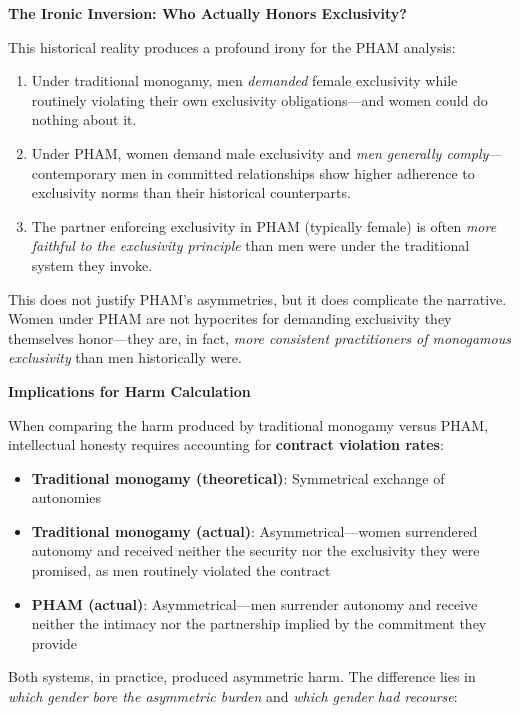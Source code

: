 \documentclass[12pt, letterpaper]{article}
\begin{document}
\textbf{The Ironic Inversion: Who Actually Honors Exclusivity?}

This historical reality produces a profound irony for the PHAM analysis:

\begin{enumerate}
    \item Under traditional monogamy, men \textit{demanded} female exclusivity while routinely violating their own exclusivity obligations---and women could do nothing about it.
    
    \item Under PHAM, women demand male exclusivity and \textit{men generally comply}---contemporary men in committed relationships show higher adherence to exclusivity norms than their historical counterparts.
    
    \item The partner enforcing exclusivity in PHAM (typically female) is often \textit{more faithful to the exclusivity principle} than men were under the traditional system they invoke.
\end{enumerate}

This does not justify PHAM's asymmetries, but it does complicate the narrative. Women under PHAM are not hypocrites for demanding exclusivity they themselves honor---they are, in fact, \textit{more consistent practitioners of monogamous exclusivity} than men historically were.

\textbf{Implications for Harm Calculation}

When comparing the harm produced by traditional monogamy versus PHAM, intellectual honesty requires accounting for \textbf{contract violation rates}:

\begin{itemize}
    \item \textbf{Traditional monogamy (theoretical)}: Symmetrical exchange of autonomies
    \item \textbf{Traditional monogamy (actual)}: Asymmetrical---women surrendered autonomy and received neither the security nor the exclusivity they were promised, as men routinely violated the contract
    \item \textbf{PHAM (actual)}: Asymmetrical---men surrender autonomy and receive neither the intimacy nor the partnership implied by the commitment they provide
\end{itemize}

Both systems, in practice, produced asymmetric harm. The difference lies in \textit{which gender bore the asymmetric burden} and \textit{which gender had recourse}:
\end{document}
